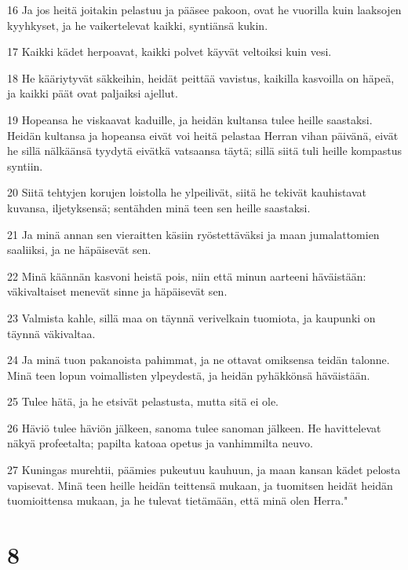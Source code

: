 \par 16 Ja jos heitä joitakin pelastuu ja pääsee pakoon, ovat he vuorilla kuin laaksojen kyyhkyset, ja he vaikertelevat kaikki, syntiänsä kukin.
\par 17 Kaikki kädet herpoavat, kaikki polvet käyvät veltoiksi kuin vesi.
\par 18 He kääriytyvät säkkeihin, heidät peittää vavistus, kaikilla kasvoilla on häpeä, ja kaikki päät ovat paljaiksi ajellut.
\par 19 Hopeansa he viskaavat kaduille, ja heidän kultansa tulee heille saastaksi. Heidän kultansa ja hopeansa eivät voi heitä pelastaa Herran vihan päivänä, eivät he sillä nälkäänsä tyydytä eivätkä vatsaansa täytä; sillä siitä tuli heille kompastus syntiin.
\par 20 Siitä tehtyjen korujen loistolla he ylpeilivät, siitä he tekivät kauhistavat kuvansa, iljetyksensä; sentähden minä teen sen heille saastaksi.
\par 21 Ja minä annan sen vieraitten käsiin ryöstettäväksi ja maan jumalattomien saaliiksi, ja ne häpäisevät sen.
\par 22 Minä käännän kasvoni heistä pois, niin että minun aarteeni häväistään: väkivaltaiset menevät sinne ja häpäisevät sen.
\par 23 Valmista kahle, sillä maa on täynnä verivelkain tuomiota, ja kaupunki on täynnä väkivaltaa.
\par 24 Ja minä tuon pakanoista pahimmat, ja ne ottavat omiksensa teidän talonne. Minä teen lopun voimallisten ylpeydestä, ja heidän pyhäkkönsä häväistään.
\par 25 Tulee hätä, ja he etsivät pelastusta, mutta sitä ei ole.
\par 26 Häviö tulee häviön jälkeen, sanoma tulee sanoman jälkeen. He havittelevat näkyä profeetalta; papilta katoaa opetus ja vanhimmilta neuvo.
\par 27 Kuningas murehtii, päämies pukeutuu kauhuun, ja maan kansan kädet pelosta vapisevat. Minä teen heille heidän teittensä mukaan, ja tuomitsen heidät heidän tuomioittensa mukaan, ja he tulevat tietämään, että minä olen Herra."

\chapter{8}

